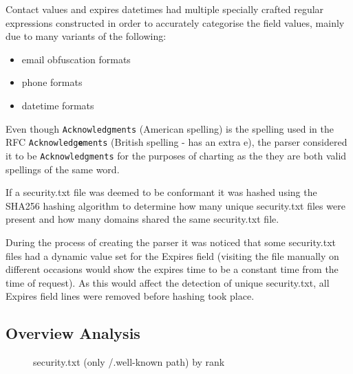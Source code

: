 \documentclass{mscreport}
\begin{document}
\vspace{0.3cm} \noindent
Contact values and expires datetimes had multiple specially crafted regular expressions constructed in order to accurately categorise the field values, mainly due to many variants of the following:

\begin{itemize}
	\setlength\itemsep{0.01em}
    \item email obfuscation formats
    \item phone formats
    \item datetime formats
\end{itemize}

\vspace{0.3cm} \noindent
Even though \texttt{Acknowledgments} (American spelling) is the spelling used in the RFC \newline  \texttt{Acknowledg\textbf{e}ments} (British spelling - has an extra e), the parser considered it to be \newline \texttt{Acknowledgments} for the purposes of charting as the they are both valid spellings of the same word.

\vspace{0.3cm} \noindent
If a security.txt file was deemed to be conformant it was hashed using the SHA256 hashing algorithm to determine how many unique security.txt files were present and how many domains shared the same security.txt file.

\vspace{0.3cm} \noindent
During the process of creating the parser it was noticed that some security.txt files had a dynamic value set for the Expires field (visiting the file manually on different occasions would show the expires time to be a constant time from the time of request). As this would affect the detection of unique security.txt, all Expires field lines were removed before hashing took place.


\subsection{Overview Analysis}

\begin{figure}[H]
	\begin{center}
		\caption{security.txt (only /.well-known path) by rank}
		\label{fig:security_txt_by_rank}
	\end{center}
\end{figure}
\end{document}

